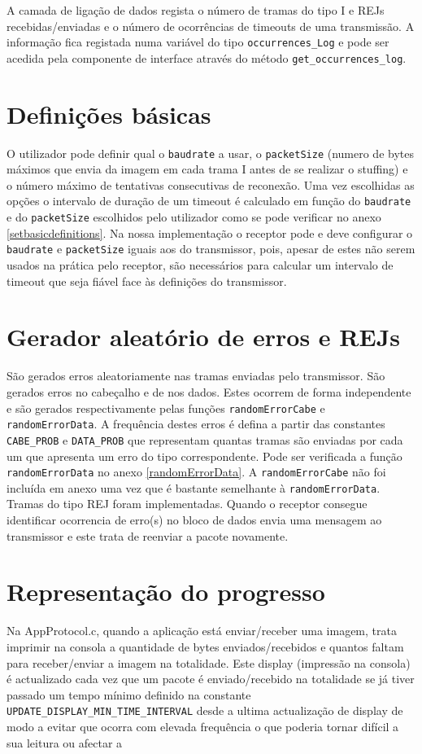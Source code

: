 \documentclass[11pt,a4paper,reqno]{report}
\numberwithin{equation}{section}
\begin{document}
A camada de ligação de dados regista o número de tramas do tipo I e REJs recebidas/enviadas e o número de ocorrências de timeouts de uma transmissão. A informação fica registada numa variável do tipo \verb|occurrences_Log| e pode ser acedida pela componente de interface através do método \verb|get_occurrences_log|.

\section{Definições básicas}

O utilizador pode definir qual o \verb|baudrate| a usar, o \verb|packetSize| (numero de bytes máximos que envia da imagem em cada trama I antes de se realizar o stuffing) e o número máximo de tentativas consecutivas de reconexão.
Uma vez escolhidas as opções o intervalo de duração de um timeout é calculado em função do \verb|baudrate| e do \verb|packetSize| escolhidos pelo utilizador como se pode verificar no anexo \ref{setbasicdefinitions}. Na nossa implementação o receptor pode e deve configurar o \verb|baudrate| e \verb|packetSize| iguais aos do transmissor, pois, apesar de estes não serem usados na prática pelo receptor, são necessários para calcular um intervalo de timeout que seja fiável face às definições do transmissor.

\section{Gerador aleatório de erros e REJs}
São gerados erros aleatoriamente nas tramas enviadas pelo transmissor. São gerados erros no cabeçalho e de nos dados. Estes ocorrem de forma independente e são gerados respectivamente pelas funções \verb|randomErrorCabe| e \verb|randomErrorData|. A frequência destes erros é defina a partir das constantes \verb|CABE_PROB| e \verb|DATA_PROB| que representam quantas tramas são enviadas por cada um que apresenta um erro do tipo correspondente. Pode ser verificada a função \verb|randomErrorData| no anexo \ref{randomErrorData}. A \verb|randomErrorCabe| não foi incluída em anexo uma vez que é bastante semelhante à \verb|randomErrorData|.
Tramas do tipo REJ foram implementadas. Quando o receptor consegue identificar ocorrencia de erro(s) no bloco de dados envia uma mensagem ao transmissor e este trata de reenviar a pacote novamente.

\section{Representação do progresso}
Na AppProtocol.c, quando a aplicação está enviar/receber uma imagem, trata imprimir na consola a quantidade de bytes enviados/recebidos e quantos faltam para receber/enviar a imagem na totalidade. Este display (impressão na consola) é actualizado cada vez que um pacote é enviado/recebido na totalidade se já tiver passado um tempo mínimo definido na constante \verb|UPDATE_DISPLAY_MIN_TIME_INTERVAL| desde a ultima actualização de display de modo a evitar que ocorra com elevada frequência o que poderia tornar difícil a sua leitura ou afectar a
\end{document}
